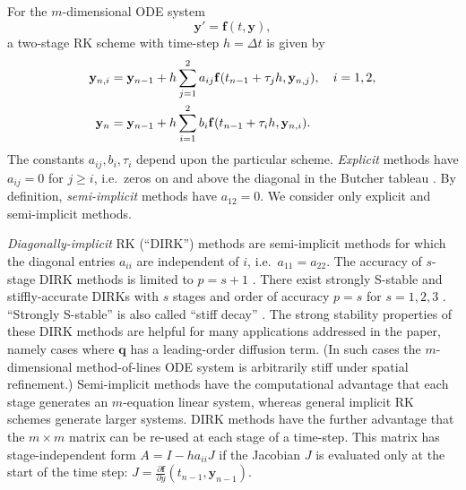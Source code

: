 \documentclass[final,leqno,onefignum,onetabnum]{siamltex1213bueler}
\newcommand\bbf{\mathbf{f}}
\newcommand\bq{\mathbf{q}}
\newcommand\by{\mathbf{y}}
\begin{document}
For the $m$-dimensional ODE system
\begin{equation}
  \by' = \bbf(t,\by),  \label{eq:abstractODE}
\end{equation}
a two-stage RK scheme \cite{AscherPetzold1998} with time-step $h=\Delta t$ is given by
\begin{align}
  \by_{n,i} &= \by_{n-1} + h \sum_{j=1}^2 a_{ij} \bbf(t_{n-1} + \tau_j h, \by_{n,j}), \quad i=1,2, \label{eq:RK2} \\
      \by_n &= \by_{n-1} + h \sum_{i=1}^2 b_i \bbf(t_{n-1} + \tau_i h, \by_{n,i}). \notag
\end{align}
The constants $a_{ij},b_i,\tau_i$ depend upon the particular scheme.  \emph{Explicit} methods have $a_{ij}=0$ for $j\ge i$, i.e.~zeros on and above the diagonal in the Butcher tableau \cite{AscherPetzold1998}.  By definition, \emph{semi-implicit} methods have $a_{12}=0$.  We consider only explicit and semi-implicit methods.

\emph{Diagonally-implicit} RK (``DIRK'') methods are semi-implicit methods for which the diagonal entries $a_{ii}$ are independent of $i$, i.e.~$a_{11}=a_{22}$.  The accuracy of $s$-stage DIRK methods is limited to $p=s+1$ \cite{AscherPetzold1998}.  There exist strongly S-stable and stiffly-accurate \cite{AscherPetzold1998} DIRKs with $s$ stages and order of accuracy $p=s$ for $s=1,2,3$ \cite{Alexander1977}.  ``Strongly S-stable'' is also called ``stiff decay'' \cite{AscherPetzold1998}.  The strong stability properties of these DIRK methods are helpful for many applications addressed in the paper, namely cases where $\bq$ has a leading-order diffusion term.  (In such cases the $m$-dimensional method-of-lines ODE system is arbitrarily stiff under spatial refinement.)  Semi-implicit methods have the computational advantage that each stage generates an $m$-equation linear system, whereas general implicit RK schemes generate larger systems.  DIRK methods have the further advantage that the $m\times m$ matrix can be re-used at each stage of a time-step.  This matrix has stage-independent form $A = I - h a_{ii} J$ if the Jacobian $J$ is evaluated only at the start of the time step: $J = \frac{\partial \bbf}{\partial y}(t_{n-1},\by_{n-1})$.
\end{document}
